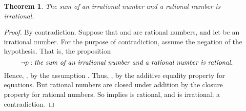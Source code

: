\documentclass[preview]{standalone}
\newtheorem{theorem}{Theorem}
\begin{document}
\begin{theorem} %
    The sum of an irrational number and a rational number is irrational.
\end{theorem}

\begin{proof}
    By contradiction. Suppose that \bm{$\mu$} and \bm{$\zeta$} are rational numbers, 
    and let \bm{$\chi$} be an irrational number. 
    For the purpose of contradiction, 
    assume the negation of the hypothesis. 
    That is, the proposition 
        $$\lnot p: \emph{the sum of an irrational number and a rational number 
        is rational.}$$
    Hence, \bm{$\chi \textbf{ + } \mu \textbf{ = } \zeta$}, 
    by the assumption . 
    Thus, 
    \bm{$\chi \textbf{ = } \zeta \textbf{ + } \big \langle \textbf{ - } \mu \big \rangle$}, 
    by the additive equality property for equations. 
    But rational numbers are closed under addition by the closure property for rational numbers. 
    So  implies \bm{$\chi$} is rational, 
    and \bm{$\chi$} is irrational; a contradiction.
\end{proof}
\end{document}
